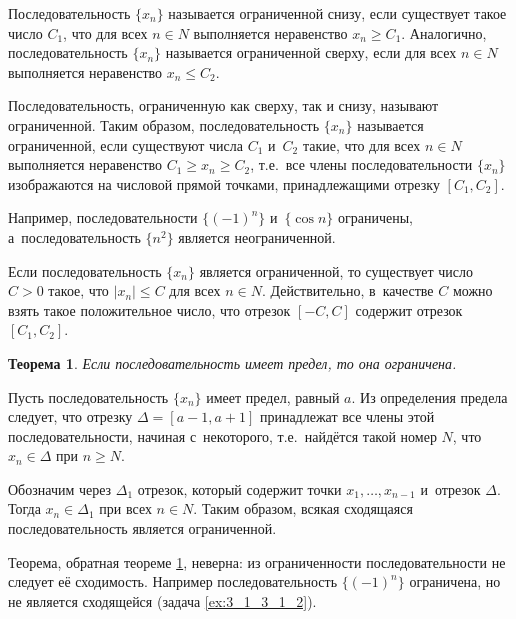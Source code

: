 
Последовательность $\{x_{n}\}$ называется ограниченной снизу, если существует
такое число $C_{1}$, что для всех $n \in N$ выполняется неравенство
$x_{n} \geqslant C_{1}$.
Аналогично, последовательность $\{x_{n}\}$ называется ограниченной сверху,
если для всех $n \in N$ выполняется неравенство $x_{n} \leqslant C_{2}$.

Последовательность, ограниченную как сверху, так и снизу, называют ограниченной.
Таким образом, последовательность $\{x_{n}\}$ называется ограниченной,
если существуют числа $C_{1}$ и~$C_{2}$ такие, что для всех $n \in N$
выполняется неравенство $C_{1} \geqslant x_{n} \geqslant C_{2}$,
т.е.\ все члены последовательности $\{x_{n}\}$ изображаются на числовой прямой
точками, принадлежащими отрезку $[C_{1}, C_{2}]$.

Например, последовательности $\{(-1)^{n}\}$ и~$\{\cos n\}$ ограничены,
а~последовательность $\{n^{2}\}$ является неограниченной.

\begin{Note}\label{nt:3_1_4_1}
Если последовательность $\{x_{n}\}$ является ограниченной, то существует число
$C > 0$ такое, что $|x_{n}| \leqslant C$ для всех $n \in N$.
Действительно, в~качестве $C$ можно взять такое положительное число,
что отрезок $[-C, C]$ содержит отрезок $[C_{1}, C_{2}]$.
\end{Note}

\newtheorem{Th}{Теорема}
\begin{Th}\label{th:3_1_4_1}
Если последовательность имеет предел, то она ограничена.
\end{Th}

Пусть последовательность $\{x_{n}\}$ имеет предел, равный $a$.
Из определения предела следует, что отрезку $\Delta = [a -1, a + 1]$ принадлежат
все члены этой последовательности, начиная с~некоторого, т.е.\ найдётся такой
номер $N$, что $x_{n} \in \Delta$ при $n \geqslant N$.

Обозначим через $\Delta_{1}$ отрезок, который содержит точки $x_{1}, \dots, x_{n-1}$
и~отрезок $\Delta$. Тогда $x_{n} \in \Delta_{1}$ при  всех $n \in N$.
Таким образом, всякая сходящаяся последовательность является ограниченной.

\begin{Note}\label{nt:3_1_4_2}
Теорема, обратная теореме \ref{th:3_1_4_1}, неверна: из ограниченности последовательности
не следует её сходимость. Например последовательность $\{(-1)^{n}\}$ ограничена,
но не является сходящейся (задача \ref{ex:3_1_3_1_2}).
\end{Note}

